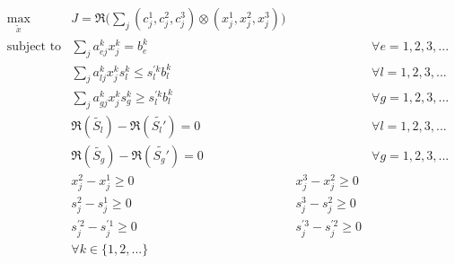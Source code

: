 \documentclass[ee,msthesis]{usuthesis}
\begin{document}
\begin{equation}
\label{eq:kumar-kaurs-crisp}
\begin{array}{lllc}
\underset{{\tilde{x}}}{\text{max}} & J = \mathfrak{R}\Big(\sum_j (c_j^1,c_j^2,c_j^3) \otimes (x_j^1,x_j^2,x_j^3)\Big) &                             &                                          \\
\text{subject to}  & \sum_j a_{ej}^k x_j^k = b_e^k                                &                                &   \forall e = 1,2,3,...        \\
                   & \sum_j a_{lj}^k x_j^k s_l^k \le s_l^{'k} b_l^k                 &                                &   \forall l = 1,2,3,...       \\
                   & \sum_j a_{gj}^k x_j^k s_g^k \ge s_l^{'k} b_l^k                 &                                &   \forall g = 1,2,3,...      \\
                   & \mathfrak{R}(\tilde{S_l}) - \mathfrak{R}(\tilde{S_l'}) = 0                      &                                &  \forall l = 1,2,3,...          \\
                   & \mathfrak{R}(\tilde{S_g}) - \mathfrak{R}(\tilde{S_g'}) = 0                      &                                &  \forall g = 1,2,3,...          \\
                   & x_j^2 - x_j^1 \ge 0                                              &x_j^3 - x_j^2 \ge 0 &         \\
                   & s_j^2 - s_j^1 \ge 0                                              &s_j^3 - s_j^2 \ge 0 &         \\
                   & s_j^{'2} - s_j^{'1} \ge 0                                        &s_j^{'3} - s_j^{'2} \ge 0 & \\
                   & \forall k \in \{1,2,...\}                                            &                            &                       \\
\end{array}
\end{equation}
\end{document}
